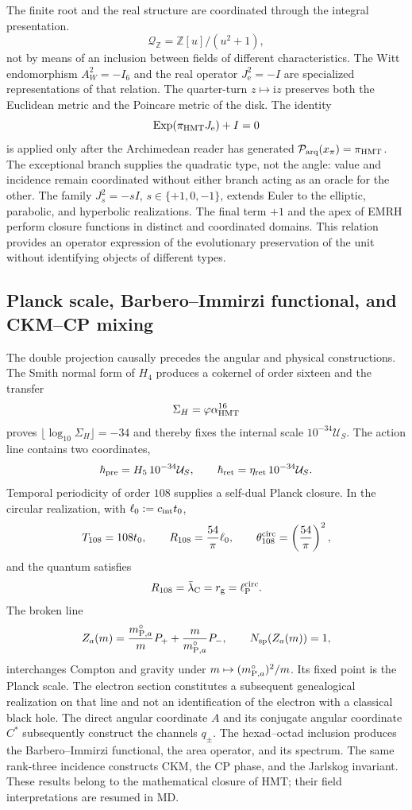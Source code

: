 The finite root and the real structure are coordinated through the integral presentation.
\[
 \mathcal Q_{\mathbb Z}=\mathbb Z[u]/(u^2+1),
\]
not by means of an inclusion between fields of different characteristics. The
Witt endomorphism \(A_W^2=-I_6\) and the real operator
\(J_{\mathrm e}^2=-I\) are specialized representations of that relation.
The quarter-turn \(z\mapsto\mathrm iz\) preserves both the Euclidean metric
and the Poincare metric of the disk. The identity
\[
 \operatorname{Exp}(\pi_{\rm HMT}J_{\mathrm e})+I=0
\]
is applied only after the Archimedean reader has generated
\(\mathcal P_{\rm arq}(x_\pi)=\pi_{\rm HMT}\). The exceptional branch supplies
the quadratic type, not the angle: value and incidence remain coordinated without
either branch acting as an oracle for the other.
The family \(J_s^2=-sI\),
\(s\in\{+1,0,-1\}\), extends Euler to the elliptic,
parabolic, and hyperbolic realizations. The final term \(+1\) and the apex of EMRH
perform closure functions in distinct and coordinated domains. This
relation provides an operator expression of the evolutionary preservation of
the unit without identifying objects of different types.

\subsection*{Planck scale, Barbero--Immirzi functional, and CKM--CP mixing}

The double projection causally precedes the angular and physical
constructions. The Smith normal form of \(H_4\) produces a cokernel
of order sixteen and the transfer
\[
 \Sigma_H=\varphi\alpha_{\rm HMT}^{16}
\]
proves
\(\lfloor\log_{10}\Sigma_H\rfloor=-34\) and thereby fixes the internal scale
\(10^{-34}\mathcal U_S\). The action line contains two coordinates,
\[
 \hbar_{\rm pre}=H_5\,10^{-34}\mathcal U_S,\qquad
 \hbar_{\rm ret}=\eta_{\rm ret}\,10^{-34}\mathcal U_S.
\]
Temporal periodicity of order \(108\) supplies a self-dual
Planck closure. In the circular realization, with
\(\ell_0:=c_{\rm int}t_0\),
\[
 T_{108}=108t_0,
 \qquad
 R_{108}=\frac{54}{\pi}\ell_0,
 \qquad
 \theta_{108}^{\rm circ}=\left(\frac{54}{\pi}\right)^2,
\]
and the quantum satisfies
\[
 R_{108}=\bar\lambda_{\rm C}=r_{\rm g}=\ell_{\rm P}^{\rm circ}.
\]
The broken line
\[
 Z_a(m)=\frac{m_{{\rm P},a}^{\circ}}mP_+
       +\frac m{m_{{\rm P},a}^{\circ}}P_-,
 \qquad N_{\rm sp}(Z_a(m))=1,
\]
interchanges Compton and gravity under \(m\mapsto(m_{{\rm P},a}^{\circ})^2/m\). Its fixed point is the Planck scale. The electron section constitutes a subsequent genealogical realization on that line and not an identification of the electron with a classical black hole.
The direct angular coordinate \(A\) and its conjugate angular coordinate \(C^*\) subsequently construct the channels \(q_\pm\). The hexad--octad inclusion produces the Barbero--Immirzi functional, the area operator, and its spectrum. The same rank-three incidence constructs CKM, the CP phase, and the Jarlskog invariant. These results belong to the mathematical closure of HMT; their field interpretations are resumed in MD.

